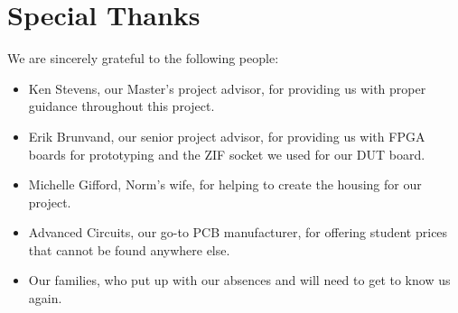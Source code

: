 \section{Special Thanks}

We are sincerely grateful to the following people: 
\begin{itemize}
\item Ken Stevens, our Master's project advisor, for providing us with proper guidance throughout this project.
\item Erik Brunvand, our senior project advisor, for providing us with FPGA boards for prototyping and the ZIF socket we used for our DUT board.
\item Michelle Gifford, Norm's wife, for helping to create the housing for our project.
\item Advanced Circuits, our go-to PCB manufacturer, for offering student prices that cannot be found anywhere else. 
\item Our families, who put up with our absences and will need to get to know us again.
\end{itemize}

\newpage
